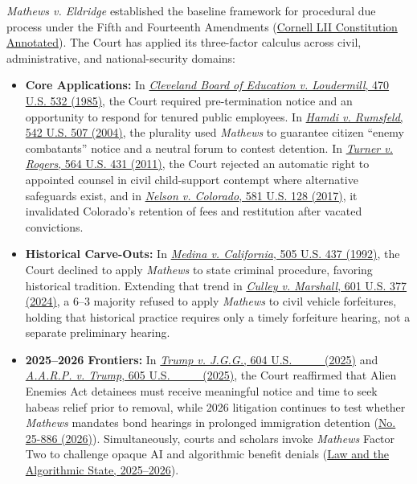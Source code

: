 \documentclass[12pt]{article}
\begin{document}
\emph{Mathews v. Eldridge} established the baseline framework for procedural due process under the Fifth and Fourteenth Amendments (\href{https://www.law.cornell.edu/constitution-conan/amendment-14/due-process-test-in-mathews-v-eldridge}{Cornell LII Constitution Annotated}). The Court has applied its three-factor calculus across civil, administrative, and national-security domains:
\begin{itemize}
    \item \textbf{Core Applications:} In \href{https://supreme.justia.com/cases/federal/us/470/532/}{\emph{Cleveland Board of Education v. Loudermill}, 470 U.S. 532 (1985)}, the Court required pre-termination notice and an opportunity to respond for tenured public employees. In \href{https://supreme.justia.com/cases/federal/us/542/507/}{\emph{Hamdi v. Rumsfeld}, 542 U.S. 507 (2004)}, the plurality used \emph{Mathews} to guarantee citizen ``enemy combatants'' notice and a neutral forum to contest detention. In \href{https://supreme.justia.com/cases/federal/us/564/431/}{\emph{Turner v. Rogers}, 564 U.S. 431 (2011)}, the Court rejected an automatic right to appointed counsel in civil child-support contempt where alternative safeguards exist, and in \href{https://supreme.justia.com/cases/federal/us/581/15-1256/}{\emph{Nelson v. Colorado}, 581 U.S. 128 (2017)}, it invalidated Colorado's retention of fees and restitution after vacated convictions.
    \item \textbf{Historical Carve-Outs:} In \href{https://supreme.justia.com/cases/federal/us/505/437/}{\emph{Medina v. California}, 505 U.S. 437 (1992)}, the Court declined to apply \emph{Mathews} to state criminal procedure, favoring historical tradition. Extending that trend in \href{https://supreme.justia.com/cases/federal/us/601/22-585/}{\emph{Culley v. Marshall}, 601 U.S. 377 (2024)}, a 6--3 majority refused to apply \emph{Mathews} to civil vehicle forfeitures, holding that historical practice requires only a timely forfeiture hearing, not a separate preliminary hearing.
    \item \textbf{2025--2026 Frontiers:} In \href{https://supreme.justia.com/cases/federal/us/604/24a931/}{\emph{Trump v. J.G.G.}, 604 U.S. \_\_\_ (2025)} and \href{https://supreme.justia.com/cases/federal/us/605/24a1007/}{\emph{A.A.R.P. v. Trump}, 605 U.S. \_\_\_ (2025)}, the Court reaffirmed that Alien Enemies Act detainees must receive meaningful notice and time to seek habeas relief prior to removal, while 2026 litigation continues to test whether \emph{Mathews} mandates bond hearings in prolonged immigration detention (\href{https://www.supremecourt.gov/DocketPDF/25/25-886/417653/20260730183018583_25-886tsUnitedStates.pdf}{No. 25-886 (2026)}). Simultaneously, courts and scholars invoke \emph{Mathews} Factor Two to challenge opaque AI and algorithmic benefit denials (\href{https://www.emerald.com/books/monograph/21582/chapter/116272831/Law-and-the-Algorithmic-State-Due-Process-Opaque?searchresult=1}{Law and the Algorithmic State, 2025--2026}).
\end{itemize}
\end{document}
